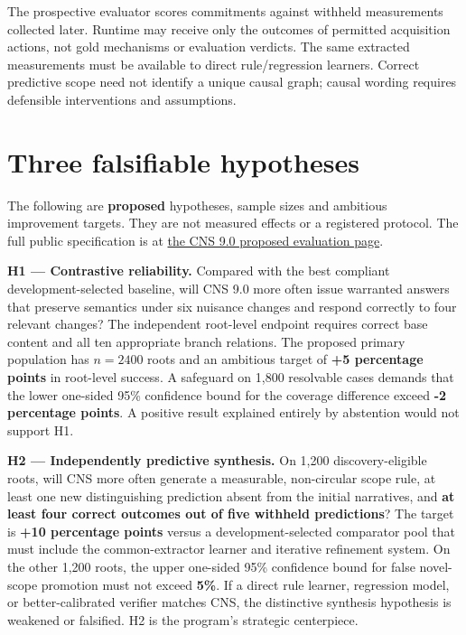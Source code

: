 \documentclass[11pt,a4paper]{article}
\begin{document}
The prospective evaluator scores commitments against withheld
measurements collected later. Runtime may receive only the outcomes of
permitted acquisition actions, not gold mechanisms or evaluation
verdicts. The same extracted measurements must be available to direct
rule/regression learners. Correct predictive scope need not identify a
unique causal graph; causal wording requires defensible interventions
and assumptions.

\section{Three falsifiable
hypotheses}\label{three-falsifiable-hypotheses}

The following are \textbf{proposed} hypotheses, sample sizes and
ambitious improvement targets. They are not measured effects or a
registered protocol. The full public specification is at
\href{https://gtcode.com/guides/cns-9/evaluation/}{the CNS 9.0 proposed
evaluation page}.

\textbf{H1 --- Contrastive reliability.} Compared with the best
compliant development-selected baseline, will CNS 9.0 more often issue
warranted answers that preserve semantics under six nuisance changes and
respond correctly to four relevant changes? The independent root-level
endpoint requires correct base content and all ten appropriate branch
relations. The proposed primary population has \(n=2400\) roots and an
ambitious target of \textbf{+5 percentage points} in root-level success.
A safeguard on 1,800 resolvable cases demands that the lower one-sided
95\% confidence bound for the coverage difference exceed \textbf{-2
percentage points}. A positive result explained entirely by abstention
would not support H1.

\textbf{H2 --- Independently predictive synthesis.} On 1,200
discovery-eligible roots, will CNS more often generate a measurable,
non-circular scope rule, at least one new distinguishing prediction
absent from the initial narratives, and \textbf{at least four correct
outcomes out of five withheld predictions}? The target is \textbf{+10
percentage points} versus a development-selected comparator pool that
must include the common-extractor learner and iterative refinement
system. On the other 1,200 roots, the upper one-sided 95\% confidence
bound for false novel-scope promotion must not exceed \textbf{5\%}. If a
direct rule learner, regression model, or better-calibrated verifier
matches CNS, the distinctive synthesis hypothesis is weakened or
falsified. H2 is the program's strategic centerpiece.
\end{document}
